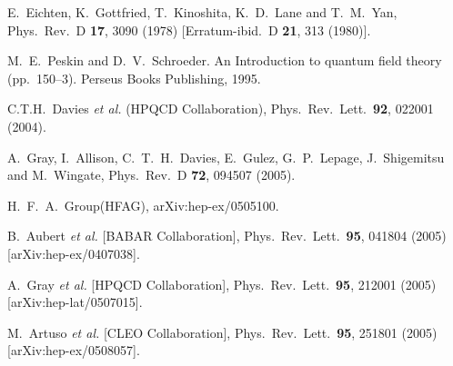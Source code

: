 \documentclass{cornell}
\begin{document}
\begin{thebibliography}{99}

E.~Eichten, K.~Gottfried, T.~Kinoshita, K.~D.~Lane and T.~M.~Yan,
  Phys.\ Rev.\ D {\bf 17}, 3090 (1978)
  [Erratum-ibid.\ D {\bf 21}, 313 (1980)].

M.~E.~Peskin and D.~V.~Schroeder.
An Introduction to quantum field theory (pp.\ 150--3). Perseus Books Publishing, 1995.

C.T.H.~Davies {\it et al.}  (HPQCD Collaboration),
Phys.\ Rev.\ Lett.\  {\bf 92}, 022001 (2004).

A.~Gray, I.~Allison, C.~T.~H.~Davies, E.~Gulez, G.~P.~Lepage, J.~Shigemitsu and M.~Wingate,
Phys.\ Rev.\ D {\bf 72}, 094507 (2005).

H.~F.~A.~Group(HFAG),
  arXiv:hep-ex/0505100.

B.~Aubert {\it et al.}  [BABAR Collaboration],
  Phys.\ Rev.\ Lett.\  {\bf 95}, 041804 (2005)
  [arXiv:hep-ex/0407038].

A.~Gray {\it et al.}  [HPQCD Collaboration],
  Phys.\ Rev.\ Lett.\  {\bf 95}, 212001 (2005)
  [arXiv:hep-lat/0507015].

M.~Artuso {\it et al.}  [CLEO Collaboration],
  Phys.\ Rev.\ Lett.\  {\bf 95}, 251801 (2005)
  [arXiv:hep-ex/0508057].


\end{thebibliography}
\end{document}

